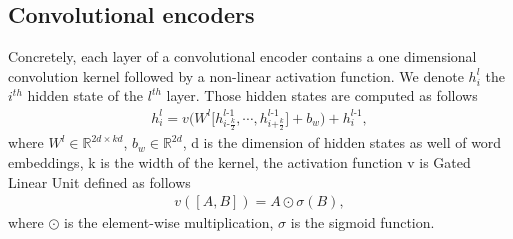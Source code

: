 \subsection{Convolutional encoders}
Concretely, each layer of a convolutional encoder contains a one dimensional convolution kernel followed by a non-linear activation function. We denote $h^l_i$ the $i^{th}$ hidden state of the $l^{th}$ layer. Those hidden states are computed as follows
\begin{equation}
\begin{array}{lcr}
h^l_i = v\bigg( W^l \big[h^{l\text{-}1}_{i\text{-}\frac{k}{2}}, \cdots, h^{l\text{-}1}_{i\text{+}\frac{k}{2}} \big] + b_w \bigg) + h^{l\text{-}1}_{i},
\end{array}
\end{equation}
where $W^l \in \mathbb{R}^{2d \times kd}$, $b_w \in \mathbb{R}^{2d}$, d is the dimension of hidden states as well of word embeddings, k is the width of the kernel, the activation function v is Gated Linear Unit \citep{Ghering17convolutional} defined as follows
\begin{equation}
\begin{array}{lcr}
v([A,B]) = A \odot \sigma(B),
\end{array}
\end{equation}
where $\odot$ is the element-wise multiplication, $\sigma$ is the sigmoid function.
